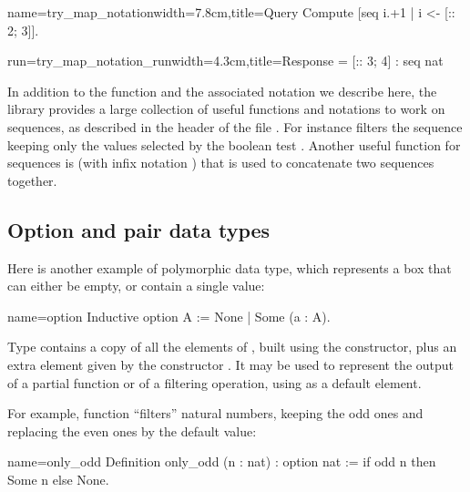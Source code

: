 \begin{coq-left}{name=try_map_notation}{width=7.8cm,title=Query}
Compute
  [seq i.+1 | i <- [:: 2; 3]].
\end{coq-left}
\begin{coqout-right}{run=try_map_notation_run}{width=4.3cm,title=Response}
= [:: 3; 4] : seq nat
$~$
\end{coqout-right}
\index[coq]{\C{[seq .. "| .. <- ..]}}
In addition to the function  and the associated notation
we describe here, the \mcbMC{} library
provides a large collection of useful functions and notations to work on
sequences, as described in the header of the file .  For
instance \C{[seq i <- s | p]} filters the sequence  keeping only
the values selected by the boolean test .
Another useful function for sequences is  (with infix notation \C{++})
that is used to concatenate two sequences together.
\index[coq]{\C{(_ ++ _)}}
\index[coq]{\C{[seq .. <- .. "| ..]}}

\subsection{Option and pair data types}\label{sec:othercontainers}

Here is another example of polymorphic data type, which represents a
box that can either be empty, or contain a single value:

\begin{coq}{name=option}{}
Inductive option A := None | Some (a : A).
\end{coq}

Type   contains a
copy of all the elements of ,
built using the  constructor, plus an extra element given by
the constructor . It may be used to represent the output of a
partial function or of a filtering operation, using  as a
default element.

For example, function  ``filters'' natural numbers, keeping the
odd ones and replacing the even ones by the  default value:

\begin{coq}{name=only_odd}{}
Definition only_odd (n : nat) : option nat :=
  if odd n then Some n else None.
\end{coq}

